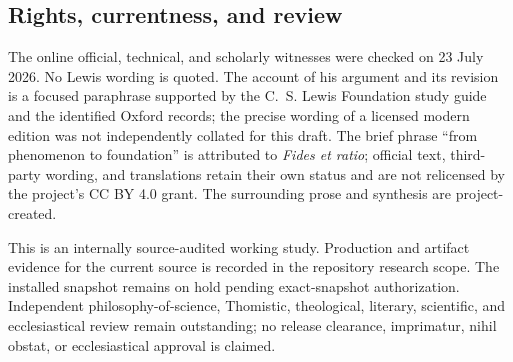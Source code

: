 \subsection{Rights, currentness, and review}

The online official, technical, and scholarly witnesses were checked on 23 July 2026. No Lewis wording is quoted. The account of his argument and its revision is a focused paraphrase supported by the C.~S. Lewis Foundation study guide and the identified Oxford records; the precise wording of a licensed modern edition was not independently collated for this draft. The brief phrase ``from phenomenon to foundation'' is attributed to \emph{Fides et ratio}; official text, third-party wording, and translations retain their own status and are not relicensed by the project's CC BY 4.0 grant. The surrounding prose and synthesis are project-created.

This is an internally source-audited working study. Production and artifact evidence for the current source is recorded in the repository research scope. The installed snapshot remains on hold pending exact-snapshot authorization. Independent philosophy-of-science, Thomistic, theological, literary, scientific, and ecclesiastical review remain outstanding; no release clearance, imprimatur, nihil obstat, or ecclesiastical approval is claimed.
